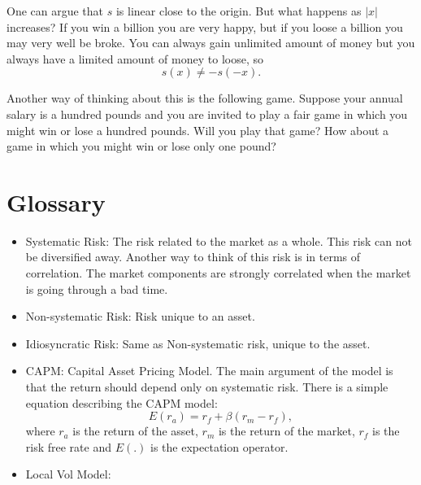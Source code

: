\documentclass{amsart}
\theoremstyle{plain}
\numberwithin{equation}{section}
\begin{document}
One can argue that $s$ is linear close to the 
origin. But what happens as $|x|$ increases?
If you win a billion you are very happy, but if you 
loose a billion you may very well be broke. You can 
always gain unlimited amount of money but you always 
have a limited amount of money to loose, so 
\begin{equation}
s(x) \neq -s(-x).
\end{equation}

Another way of thinking about this is the following 
game. Suppose your annual salary is a hundred pounds
and you are invited to play a fair game in which you 
might win or lose a hundred pounds. Will you play that 
game? How about a game in which you might win or lose 
only one pound?

\section{Glossary}
\begin{itemize}
\item Systematic Risk: The risk related to the market as a whole. This 
risk can not be diversified away. Another way to think of this risk 
is in terms of correlation. The market components are strongly correlated
when the market is going through a bad time.
\item Non-systematic Risk: Risk unique to an asset.
\item Idiosyncratic Risk: Same as Non-systematic risk, unique to the asset.
\item CAPM: Capital Asset Pricing Model. The main argument of the model is that 
the return should depend only on systematic risk. There is a simple 
equation describing the CAPM model:
\begin{equation}
E(r_a) = r_f + \beta( r_m - r_f ),
\label{eq:capm}
\end{equation}
where $r_a$ is the return of the asset,
$r_m$ is the return of the market, 
$r_f$ is the risk free rate and $E(.)$ is 
the expectation operator. 
	
\item Local Vol Model: 
\end{itemize}

%


\end{document}
